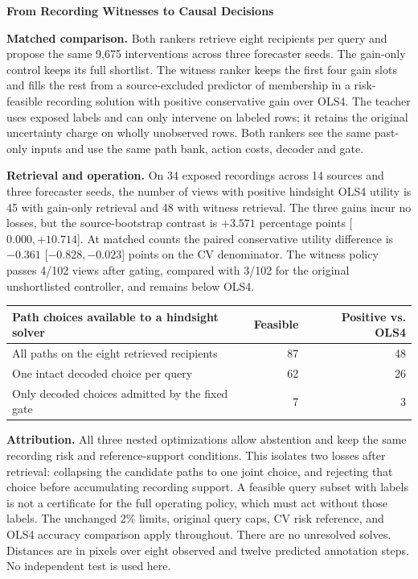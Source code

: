 \documentclass[10pt,letterpaper]{article}
\begin{document}
{\Large\bfseries From Recording Witnesses to Causal Decisions}

\textbf{Matched comparison.}
Both rankers retrieve eight recipients per query and propose the same
9,675 interventions across three forecaster seeds. The gain-only
control keeps its full shortlist. The witness ranker keeps the first
four gain slots and fills the rest from a source-excluded predictor of
membership in a risk-feasible recording solution with positive
conservative gain over OLS4. The teacher uses exposed labels and can
only intervene on labeled rows; it retains the original uncertainty
charge on wholly unobserved rows. Both rankers see the same past-only
inputs and use the same path bank, action costs, decoder and gate.

\textbf{Retrieval and operation.}
On 34 exposed recordings across 14 sources and three forecaster
seeds, the number of views with positive hindsight OLS4 utility is
45 with gain-only retrieval and 48 with witness retrieval. The
three gains incur no losses, but the source-bootstrap contrast is
$+3.571$ percentage points [$0.000,+10.714$]. At matched counts the
paired conservative utility difference is $-0.361$ [$-0.828,-0.023$]
points on the CV denominator. The witness policy passes 4/102 views
after gating, compared with 3/102 for the original unshortlisted
controller, and remains below OLS4.

\begin{center}
\begin{tabular}{@{}lrr@{}}
\toprule
Path choices available to a hindsight solver & Feasible & Positive vs. OLS4 \\
\midrule
All paths on the eight retrieved recipients & 87 & 48 \\
One intact decoded choice per query & 62 & 26 \\
Only decoded choices admitted by the fixed gate & 7 & 3 \\
\bottomrule
\end{tabular}
\end{center}

\textbf{Attribution.}
All three nested optimizations allow abstention and keep the same
recording risk and reference-support conditions. This isolates two
losses after retrieval: collapsing the candidate paths to one joint
choice, and rejecting that choice before accumulating recording
support. A feasible query subset with labels is not a certificate
for the full operating policy, which must act without those labels.
The unchanged 2\% limits, original query caps, CV risk reference,
and OLS4 accuracy comparison apply throughout. There are no unresolved
solves. Distances are in pixels over eight observed and twelve
predicted annotation steps. No independent test is used here.
\end{document}
